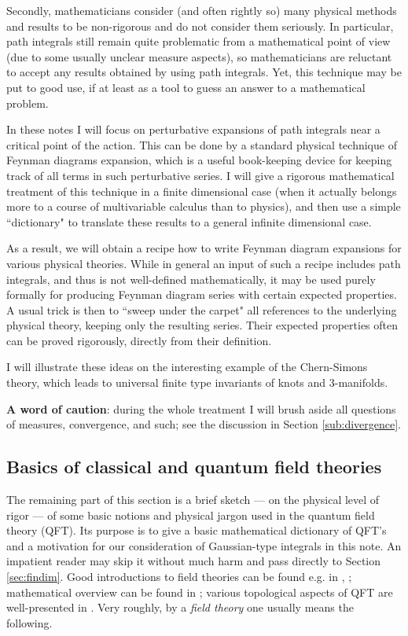 \documentclass[10pt]{amsart}
\theoremstyle{definition}
\theoremstyle{remark}
\begin{document}
Secondly, mathematicians consider (and often rightly so) many
physical methods and results to be non-rigorous and do not
consider them seriously. In particular, path integrals still
remain quite problematic from a mathematical point of view (due to
some usually unclear measure aspects), so mathematicians are
reluctant to accept any results obtained by using path integrals.
Yet, this technique may be put to good use, if at least as a
tool to guess an answer to a mathematical problem.

In these notes I will focus on perturbative expansions of path
integrals near a critical point of the action. This can be done by
a standard physical technique of Feynman diagrams expansion, which
is a useful book-keeping device for keeping track of all terms in
such perturbative series. I will give a rigorous mathematical
treatment of this technique in a finite dimensional case (when it
actually belongs more to a course of multivariable calculus than to
physics), and then use a simple ``dictionary" to translate these
results to a general infinite dimensional case.

As a result, we will obtain a recipe how to write Feynman diagram
expansions for various physical theories. While in general an
input of such a recipe includes path integrals, and thus is not
well-defined mathematically, it may be used purely formally for
producing Feynman diagram series with certain expected properties.
A usual trick is then to ``sweep under the carpet" all references
to the underlying physical theory, keeping only the resulting
series. Their expected properties often can be proved rigorously,
directly from their definition.

I will illustrate these ideas on the interesting example of the
Chern-Simons theory, which leads to universal finite type
invariants of knots and 3-manifolds.

{\bf A word of caution}: during the whole treatment I will brush
aside all questions of measures, convergence, and such; see the
discussion in Section \ref{sub:divergence}.


\subsection{Basics of classical and quantum field theories}
The remaining part of this section is a brief sketch ---  on the
physical level of rigor ---  of some basic notions and physical
jargon used in the quantum field theory (QFT). Its purpose is
to give a basic mathematical dictionary of QFT's and a motivation
for our consideration of Gaussian-type integrals in this note.
An impatient reader may skip it without much harm and pass directly
to Section \ref{sec:findim}.
Good introductions to field theories can be found e.g. in \cite{DI},
\cite{Pol}; mathematical overview can be found in \cite{string};
various topological aspects of QFT are well-presented in \cite{Sc}.
Very roughly, by a {\em field theory} one usually means the following.
\end{document}
